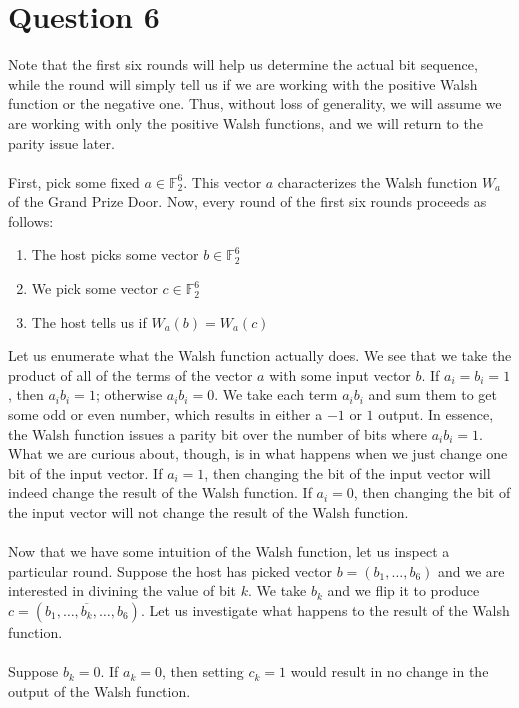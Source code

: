 \documentclass[letterpaper]{article}
\begin{document}
\section{Question 6}
\label{sec:Question6}
Note that the first six rounds will help us determine the actual bit sequence, while the  round will simply tell us if we are working with the positive Walsh function or the negative one.
Thus, without loss of generality, we will assume we are working with only the positive Walsh functions, and we will return to the parity issue later.
\\ \\
First, pick some fixed $ a \in \mathbb{F}_2^6 $.
This vector $ a $ characterizes the Walsh function $ W_a $ of the Grand Prize Door.
Now, every round of the first six rounds proceeds as follows:
\begin{enumerate}
    \item The host picks some vector $ b \in \mathbb{F}_2^6 $
    \item We pick some vector $ c \in \mathbb{F}_2^6 $
    \item The host tells us if $ W_a(b) = W_a(c) $
\end{enumerate}
Let us enumerate what the Walsh function actually does.
We see that we take the product of all of the terms of the vector $ a $ with some input vector $ b $.
If $ a_i = b_i = 1 $, then $ a_i b_i = 1 $; otherwise $ a_i b_i = 0 $.
We take each term $ a_i b_i $ and sum them to get some odd or even number, which results in either a $ -1 $ or $ 1 $ output.
In essence, the Walsh function issues a parity bit over the number of bits where $ a_i b_i = 1 $.
What we are curious about, though, is in what happens when we just change one bit of the input vector.
If $ a_i = 1 $, then changing the bit of the input vector will indeed change the result of the Walsh function.
If $ a_i = 0 $, then changing the bit of the input vector will not change the result of the Walsh function.
\\ \\
Now that we have some intuition of the Walsh function, let us inspect a particular round.
Suppose the host has picked vector $ b = (b_1, \ldots, b_6) $ and we are interested in divining the value of bit $ k $.
We take $ b_k $ and we flip it to produce $ c = (b_1, \ldots, \overline{b_k}, \ldots, b_6) $.
Let us investigate what happens to the result of the Walsh function.
\\ \\
Suppose $ b_k = 0 $.
If $ a_k = 0 $, then setting $ c_k = 1 $ would result in no change in the output of the Walsh function.
\end{document}
